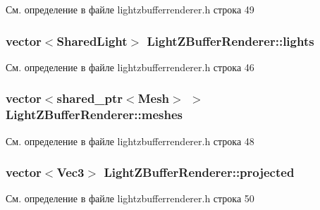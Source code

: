 См. определение в файле lightzbufferrenderer.\+h строка 49

\subsubsection[{\texorpdfstring{lights}{lights}}]{\setlength{\rightskip}{0pt plus 5cm}vector$<${\bf Shared\+Light}$>$ Light\+Z\+Buffer\+Renderer\+::lights\hspace{0.3cm}{\ttfamily [protected]}}\hypertarget{class_light_z_buffer_renderer_aa656a2afff0d9f793c6f93000fdc6f88}{}\label{class_light_z_buffer_renderer_aa656a2afff0d9f793c6f93000fdc6f88}


См. определение в файле lightzbufferrenderer.\+h строка 46

\subsubsection[{\texorpdfstring{meshes}{meshes}}]{\setlength{\rightskip}{0pt plus 5cm}vector$<$shared\+\_\+ptr$<${\bf Mesh}$>$ $>$ Light\+Z\+Buffer\+Renderer\+::meshes\hspace{0.3cm}{\ttfamily [protected]}}\hypertarget{class_light_z_buffer_renderer_ab019713ebac78d9b63039a06900f1c76}{}\label{class_light_z_buffer_renderer_ab019713ebac78d9b63039a06900f1c76}


См. определение в файле lightzbufferrenderer.\+h строка 48

\subsubsection[{\texorpdfstring{projected}{projected}}]{\setlength{\rightskip}{0pt plus 5cm}vector$<${\bf Vec3}$>$ Light\+Z\+Buffer\+Renderer\+::projected\hspace{0.3cm}{\ttfamily [protected]}}\hypertarget{class_light_z_buffer_renderer_a809ed37dacd61c93f142be3ed674bc6f}{}\label{class_light_z_buffer_renderer_a809ed37dacd61c93f142be3ed674bc6f}


См. определение в файле lightzbufferrenderer.\+h строка 50

